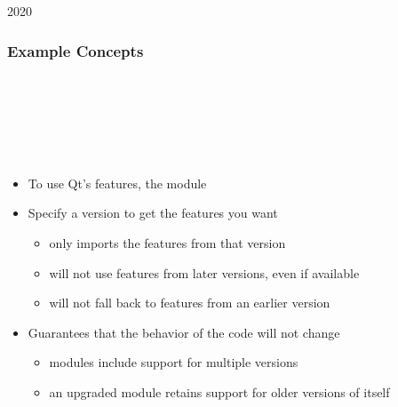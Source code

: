 \begin{slide}{2020}\frametitle{Example Concepts}

\begin{qml}
\\
\vspace*{0.5em}
\\
\vspace*{0.5em}
\\
\\
\\
\end{qml}

\vspace*{1em}
\begin{itemize}
\item To use Qt's features,  the  module
\item Specify a version to get the features you want
  \begin{itemize}
  \item only imports the features from that version
  \item will not use features from later versions, even if available
  \item will not fall back to features from an earlier version
  \end{itemize}
\item Guarantees that the behavior of the code will not change
  \begin{itemize}
  \item modules include support for multiple versions
  \item an upgraded module retains support for older versions of itself
  \end{itemize}
\end{itemize}


\end{slide}


